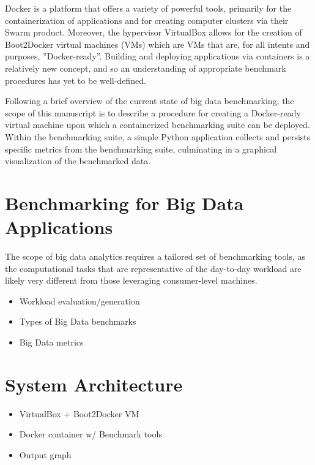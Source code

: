 \documentclass[sigconf]{acmart}
\begin{document}
Docker is a platform that offers a variety of powerful tools, primarily for the containerization of applications and for creating computer clusters via their Swarm product. Moreover, the hypervisor VirtualBox allows for the creation of Boot2Docker virtual machines (VMs) which are VMs that are, for all intents and purposes, ''Docker-ready''. Building and deploying applications via containers is a relatively new concept, and so an understanding of appropriate benchmark procedures has yet to be well-defined. 

Following a brief overview of the current state of big data benchmarking, the scope of this manuscript is to describe a procedure for creating a Docker-ready virtual machine upon which a containerized benchmarking suite can be deployed. Within the benchmarking suite, a simple Python application collects and persists specific metrics from the benchmarking suite, culminating in a graphical visualization of the benchmarked data. 

\section{Benchmarking for Big Data Applications}

The scope of big data analytics requires a tailored set of benchmarking tools, as the computational tasks that are representative of the day-to-day workload are likely very different from those leveraging consumer-level machines.

\begin{itemize}
  \item Workload evaluation/generation
  \item Types of Big Data benchmarks
  \item Big Data metrics
\end{itemize}

\section{System Architecture}

\begin{itemize}
  \item VirtualBox + Boot2Docker VM
  \item Docker container w/ Benchmark tools
  \item Output graph
\end{itemize}
\end{document}
